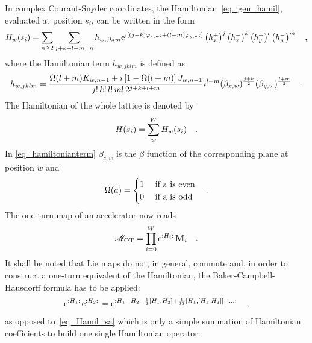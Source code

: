 In complex Courant-Snyder coordinates, the Hamiltonian~\eqref{eq_gen_hamil}, evaluated at position $s_i$,
can be written in the form
%
\begin{equation}
    H_w(s_i) = \sum\limits_{n\geq2} \sum\limits_{j+k+l+m=n} h_{w,jklm}
    \text{e}^{i \left[
        (j-k) \varphi_{x,wi} + (l-m) \varphi_{y,wi}
    \right]}
    \left(h_x^+\right)^j
    \left(h_x^-\right)^k
    \left(h_y^+\right)^l
    \left(h_y^-\right)^m
    \quad ,
\end{equation}
%
where the Hamiltonian term $h_{w,jklm}$ is defined as
%
\begin{equation}
    h_{w,jklm} = 
    \frac{
        \Omega(l+m) K_{w,n-1} + i\left[1-\Omega(l+m)\right] J_{w,n-1}
    }{
        j!\,k!\,l!\,m!\,2^{j+k+l+m}
    }
    i^{l+m}
    (\beta_{x,w})^{\frac{j+k}{2}}
    (\beta_{y,w})^{\frac{l+m}{2}}
    \quad .
    \label{eq_hamiltonianterm}
\end{equation}
%
The Hamiltonian of the whole lattice is denoted by
%
\begin{equation}
    H(s_i) = \sum\limits_w^W H_w(s_i)
    \label{eq_Hamil_sa}
    \quad .
\end{equation}
%
In \eqref{eq_hamiltonianterm} $\beta_{z,w}$ is the $\beta$ function of the corresponding plane at position $w$
and
%
\begin{equation}
    \Omega(a) = 
    \begin{cases}
        1 &\text{ if a is even} \\
        0 &\text{ if a is odd} \\
    \end{cases}
    \quad .
\end{equation}
%
The one-turn map of an accelerator now reads
%
\begin{equation}
    \mathscr{M}_\text{OT} = \prod\limits_{i=0}^W \text{e}^{{:}H_i{:}\,} \mathbf{M}_i
    \label{eq_one_turn_lie}
    \quad .
\end{equation}
%
It shall be noted that Lie maps do not, in general, commute and, in order to construct
a one-turn equivalent of the Hamiltonian, the Baker-Campbell-Hausdorff formula has to be applied:
%
\begin{equation}
    \text{e}^{{:}H_1{:}\,}\text{e}^{{:}H_2{:}\,} = \text{e}^{{:}H_1 + H_2 + \frac{1}{2}[H_1,H_2]
    + \frac{1}{12} [H_1, [H_1, H_2]] + \ldots{:}\,}
    \quad ,
\end{equation}
%
as opposed to~\eqref{eq_Hamil_sa} which is only a simple summation of Hamiltonian coefficients
to build one single Hamiltonian operator.

